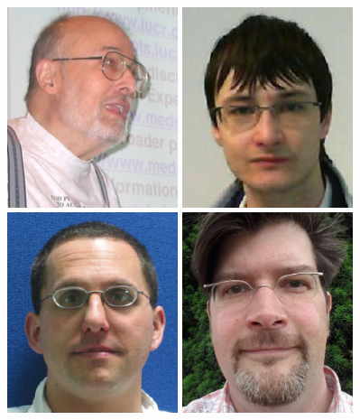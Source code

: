 \documentclass[11pt]{a0poster}
\begin{document}
\begin{minipage}[]{.29\linewidth}
\begin{figure}[H]
\begin{center}
\includegraphics[width=50mm]{Bernstein_Herbert}
\includegraphics[width=50mm]{Sloan_Jonathan}
\includegraphics[width=50mm]{Winter_Graeme}
\includegraphics[width=50mm]{Richter_Tobias}
\end{center}
\end{figure}

\end{minipage}\hfill%
\end{document}
